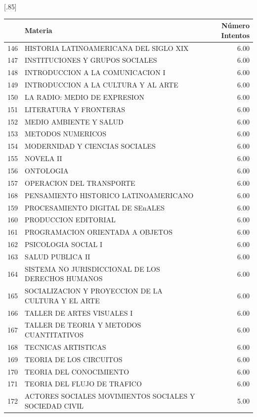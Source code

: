 \documentclass[12pt]{article}
\begin{document}
\begin{table}[ht]
\centering
\scalebox{0.75}[.85]{
\begin{tabular}{rlr}
  \hline
 & Materia & N\'umero Intentos \\ 
  \hline
  146 & HISTORIA LATINOAMERICANA DEL SIGLO XIX & 6.00 \\ 
  147 & INSTITUCIONES Y GRUPOS SOCIALES & 6.00 \\ 
  148 & INTRODUCCION A LA COMUNICACION I & 6.00 \\ 
  149 & INTRODUCCION A LA CULTURA Y AL ARTE & 6.00 \\ 
  150 & LA RADIO: MEDIO DE EXPRESION & 6.00 \\ 
  151 & LITERATURA Y FRONTERAS & 6.00 \\ 
  152 & MEDIO AMBIENTE Y SALUD & 6.00 \\ 
  153 & METODOS NUMERICOS & 6.00 \\ 
  154 & MODERNIDAD Y CIENCIAS SOCIALES & 6.00 \\ 
  155 & NOVELA II & 6.00 \\ 
  156 & ONTOLOGIA & 6.00 \\ 
  157 & OPERACION DEL TRANSPORTE & 6.00 \\ 
  168 & PENSAMIENTO HISTORICO LATINOAMERICANO & 6.00 \\ 
  159 & PROCESAMIENTO DIGITAL DE SEnALES & 6.00 \\ 
  160 & PRODUCCION EDITORIAL & 6.00 \\ 
  161 & PROGRAMACION ORIENTADA A OBJETOS& 6.00 \\ 
  162 & PSICOLOGIA SOCIAL I & 6.00 \\ 
  163 & SALUD PUBLICA II & 6.00 \\ 
  164 & SISTEMA NO JURISDICCIONAL DE LOS DERECHOS HUMANOS & 6.00 \\ 
  165 & SOCIALIZACION Y PROYECCION DE LA CULTURA Y EL ARTE & 6.00 \\ 
  166 & TALLER DE ARTES VISUALES I & 6.00 \\ 
  167 & TALLER DE TEORIA Y METODOS CUANTITATIVOS & 6.00 \\ 
  168 & TECNICAS ARTISTICAS & 6.00 \\ 
  169 & TEORIA DE LOS CIRCUITOS & 6.00 \\ 
  170 & TEORIA DEL CONOCIMIENTO & 6.00 \\ 
  171 & TEORIA DEL FLUJO DE TRAFICO & 6.00 \\ 
  172 & ACTORES SOCIALES MOVIMIENTOS SOCIALES Y SOCIEDAD CIVIL& 5.00 \\ 

\end{tabular}}
\end{table}
\end{document}
